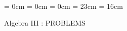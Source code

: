 

\topmargin = 0cm
\oddsidemargin = 0cm \evensidemargin = 0cm
\textheight = 23cm \textwidth = 16cm %

\newcommand{\bZ}{\mbox{\boldmath $Z$}}
\newcommand{\bQ}{\mbox{\boldmath $Q$}}
\newcommand{\bR}{\mbox{\boldmath $R$}}
\newcommand{\bC}{\mbox{\boldmath $C$}}
\newcommand{\bN}{\mbox{\boldmath $N$}}
\newcommand{\bF}{\mbox{\boldmath $F$}}

\def\labelenumi{\thesection.\theenumi}

\begin{center}
{\LARGE\gt Algebra III :  PROBLEMS}
\end{center}

